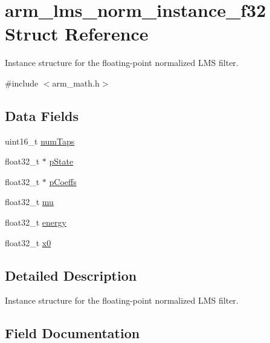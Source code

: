 \hypertarget{structarm__lms__norm__instance__f32}{}\section{arm\+\_\+lms\+\_\+norm\+\_\+instance\+\_\+f32 Struct Reference}
\label{structarm__lms__norm__instance__f32}


Instance structure for the floating-\/point normalized L\+MS filter.  




{\ttfamily \#include $<$arm\+\_\+math.\+h$>$}

\subsection*{Data Fields}
\begin{DoxyCompactItemize}
\item 
uint16\+\_\+t \mbox{\hyperlink{structarm__lms__norm__instance__f32_a751941891e47f522a7f5375fe8990aac}{num\+Taps}}
\item 
float32\+\_\+t $\ast$ \mbox{\hyperlink{structarm__lms__norm__instance__f32_a335c87e6fdc4b96601d95a5de8b9c463}{p\+State}}
\item 
float32\+\_\+t $\ast$ \mbox{\hyperlink{structarm__lms__norm__instance__f32_aacbb8dd8eeba4b21fc2bb40076405ee3}{p\+Coeffs}}
\item 
float32\+\_\+t \mbox{\hyperlink{structarm__lms__norm__instance__f32_a11402afa7c9b9dac4cb953fa386e74d2}{mu}}
\item 
float32\+\_\+t \mbox{\hyperlink{structarm__lms__norm__instance__f32_ae1ed544b72f1510ed55d144a9424fddd}{energy}}
\item 
float32\+\_\+t \mbox{\hyperlink{structarm__lms__norm__instance__f32_ab56b6f83c5b324c3ef620474b6e5a6e1}{x0}}
\end{DoxyCompactItemize}


\subsection{Detailed Description}
Instance structure for the floating-\/point normalized L\+MS filter. 

\subsection{Field Documentation}
\mbox{\label{structarm__lms__norm__instance__f32_ae1ed544b72f1510ed55d144a9424fddd}} 
